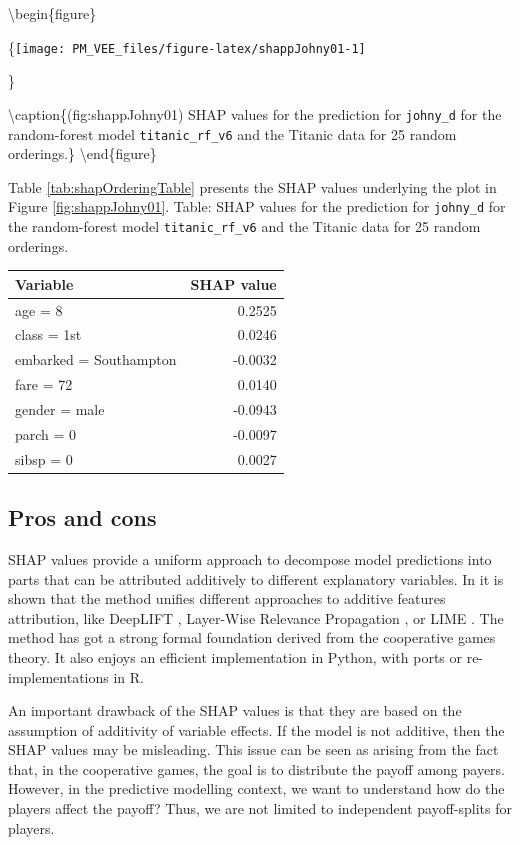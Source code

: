 \documentclass[12pt,]{krantz}
\begin{document}
\textbackslash{}begin\{figure\}

\{\centering \texttt{[image: PM\_VEE\_files/figure-latex/shappJohny01-1]}

\}

\textbackslash{}caption\{(fig:shappJohny01) SHAP values for the prediction for \texttt{johny\_d} for the random-forest model \texttt{titanic\_rf\_v6} and the Titanic data for 25 random orderings.\}\label{fig:shappJohny01}
\textbackslash{}end\{figure\}

Table \ref{tab:shapOrderingTable} presents the SHAP values underlying the plot in Figure \ref{fig:shappJohny01}.
Table: \label{tab:shapOrderingTable} SHAP values for the prediction for \texttt{johny\_d} for the random-forest model \texttt{titanic\_rf\_v6} and the Titanic data for 25 random orderings.

\begin{longtable}[]{@{}lr@{}}
\toprule
Variable & SHAP value\tabularnewline
\midrule
\endhead
age = 8 & 0.2525\tabularnewline
class = 1st & 0.0246\tabularnewline
embarked = Southampton & -0.0032\tabularnewline
fare = 72 & 0.0140\tabularnewline
gender = male & -0.0943\tabularnewline
parch = 0 & -0.0097\tabularnewline
sibsp = 0 & 0.0027\tabularnewline
\bottomrule
\end{longtable}

\hypertarget{SHAProsCons}{%
\subsection{Pros and cons}\label{SHAProsCons}}

SHAP values provide a uniform approach to decompose model predictions into parts that can be attributed additively to different explanatory variables. In \citep{SHAP} it is shown that the method unifies different approaches to additive features attribution, like DeepLIFT \citep{DeepLIFT}, Layer-Wise Relevance Propagation \citep{LWRP}, or LIME \citep{lime}. The method has got a strong formal foundation derived from the cooperative games theory. It also enjoys an efficient implementation in Python, with ports or re-implementations in R.

An important drawback of the SHAP values is that they are based on the assumption of additivity of variable effects. If the model is not additive, then the SHAP values may be misleading. This issue can be seen as arising from the fact that, in the cooperative games, the goal is to distribute the payoff among payers. However, in the predictive modelling context, we want to understand how do the players affect the payoff? Thus, we are not limited to independent payoff-splits for players.
\end{document}

